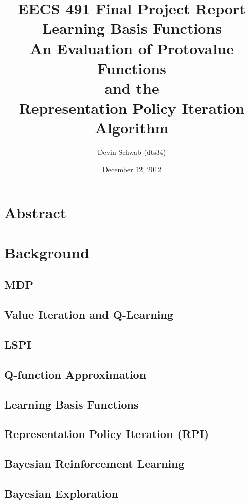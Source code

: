 \documentclass[12pt, letterpaper, final]{report}
\author{Devin Schwab (dts34)}
\title{EECS 491 Final Project Report \\ 
\vspace{5 mm}
Learning Basis Functions\\ 
\vspace{5 mm}
 An Evaluation of Protovalue Functions\\
 and the\\
 Representation Policy Iteration Algorithm}
\date{December 12, 2012}
\begin{document}
\maketitle

\tableofcontents
\newpage
\listoffigures

\section{Abstract}

\section{Background}

\subsection*{MDP}

\subsection*{Value Iteration and Q-Learning}

\subsection*{LSPI}

\subsection*{Q-function Approximation}

\subsection*{Learning Basis Functions}

\subsection*{Representation Policy Iteration (RPI)}

\subsection*{Bayesian Reinforcement Learning}

\subsection*{Bayesian Exploration}
\end{document}
